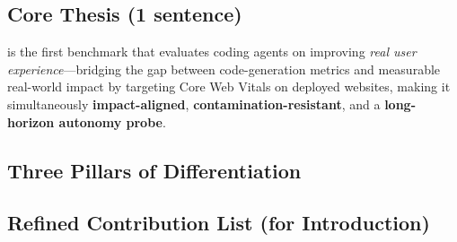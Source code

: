 \subsection{Core Thesis (1 sentence)}
\OurBench is the first benchmark that evaluates coding agents on improving \emph{real user experience}---bridging the gap between code-generation metrics and measurable real-world impact by targeting Core Web Vitals on deployed websites, making it simultaneously \textbf{impact-aligned}, \textbf{contamination-resistant}, and a \textbf{long-horizon autonomy probe}.

\subsection{Three Pillars of Differentiation}

\subsection{Refined Contribution List (for Introduction)}

